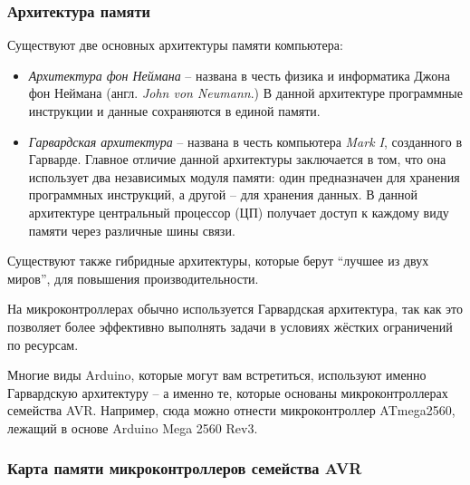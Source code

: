 \documentclass[../sparc.tex]{subfiles}
\begin{document}
\subsubsection{Архитектура памяти}

Существуют две основных архитектуры памяти компьютера:
\begin{itemize}
\item \emph{Архитектура фон Неймана} -- названа в честь физика и информатика
  Джона фон Неймана (англ. \textit{John von Neumann}.)  В данной архитектуре
  программные инструкции и данные сохраняются в единой памяти.
\item \emph{Гарвардская архитектура} -- названа в честь компьютера \emph{Mark I},
  созданного в Гарварде.  Главное отличие данной архитектуры заключается в том,
  что она использует два независимых модуля памяти: один предназначен для
  хранения программных инструкций, а другой -- для хранения данных.  В данной
  архитектуре центральный процессор (ЦП) получает доступ к каждому виду памяти
  через различные шины связи.
\end{itemize}

Существуют также гибридные архитектуры, которые берут ``лучшее из двух миров'',
для повышения производительности.

На микроконтроллерах обычно используется Гарвардская архитектура, так как это
позволяет более эффективно выполнять задачи в условиях жёстких ограничений по
ресурсам.

Многие виды Arduino, которые могут вам встретиться, используют именно
Гарвардскую архитектуру -- а именно те, которые основаны микроконтроллерах
семейства AVR.  Например, сюда можно отнести микроконтроллер ATmega2560, лежащий
в основе Arduino Mega 2560 Rev3.\cite{arduino:memory-guide}

\subsubsection{Карта памяти микроконтроллеров семейства AVR}


\end{document}
